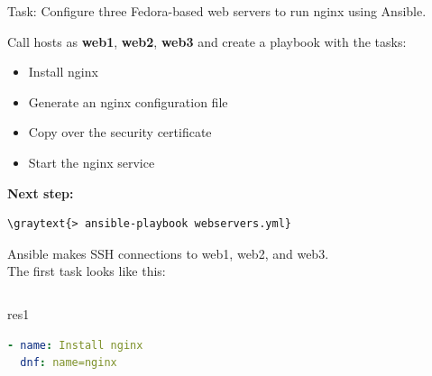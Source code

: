 \documentclass[pdf, 8pt, unicode, t]{beamer} %
\newcommand{\graytext}[1]{{\usebeamercolor[fg]{graytext_color}#1}}
\begin{document}
\begin{frame}[fragile]
\begin{block}{Task:}
Configure three Fedora-based web servers to run nginx using Ansible.
\end{block}
\vspace{1em}
Call hosts as {\bf web1}, {\bf web2}, {\bf web3} and create a playbook with the tasks:
\begin{itemize}
\item Install nginx
\item Generate an nginx configuration file
\item Copy over the security certificate
\item Start the nginx service
\end{itemize}
\vspace{2mm}
{\bf Next step:}\\
\begin{Verbatim}[commandchars=\\\{\}]
\graytext{> ansible-playbook webservers.yml}
\end{Verbatim}
Ansible makes SSH connections to web1, web2, and web3.\\
\vspace{2em}
The first task looks like this:
\vspace{2em}
\begin{columns}[t]
\begin{beamercolorbox}[sep=-1.0em,rounded=true,shadow=true,center]{res1}
\begin{lstlisting}[language=yaml]
- name: Install nginx
  dnf: name=nginx
\end{lstlisting}
\end{beamercolorbox}
\end{columns}
\end{frame}
\end{document}
